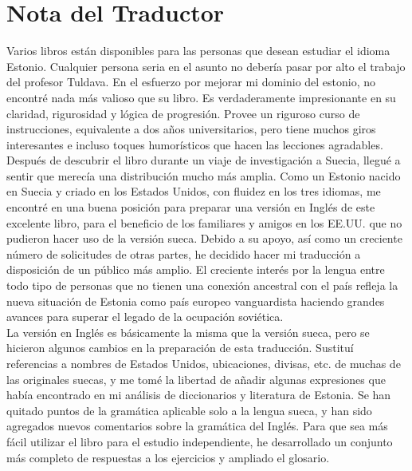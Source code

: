 

\chapter*{Nota del Traductor} %

Varios libros están disponibles para las personas que desean estudiar el idioma Estonio. Cualquier persona seria en el asunto no debería pasar por alto el trabajo del profesor Tuldava. En el esfuerzo por mejorar mi dominio del estonio, no encontré nada más valioso que su libro. Es verdaderamente impresionante en su claridad, rigurosidad y lógica de progresión. Provee un riguroso curso de instrucciones, equivalente a dos años universitarios, pero tiene muchos giros interesantes e incluso toques humorísticos que hacen las lecciones agradables.\\

Después de descubrir el libro durante un viaje de investigación a Suecia, llegué a sentir que merecía una distribución mucho más amplia. Como un Estonio nacido en Suecia y criado en los Estados Unidos, con fluidez en los tres idiomas, me encontré en una buena posición para preparar una versión en Inglés de este excelente libro, para el beneficio de los familiares y amigos en los EE.UU. que no pudieron hacer uso de la versión sueca. Debido a su apoyo, así como un creciente número de solicitudes de otras partes, he decidido hacer mi traducción a disposición de un público más amplio. El creciente interés por la lengua entre todo tipo de personas que no tienen una conexión ancestral con el país refleja la nueva situación de Estonia como país europeo vanguardista haciendo grandes avances para superar el legado de la ocupación soviética.\\

La versión en Inglés es básicamente la misma que la versión sueca, pero se hicieron algunos cambios en la preparación de esta traducción. Sustituí referencias a nombres de Estados Unidos, ubicaciones, divisas, etc. de muchas de las originales suecas, y me tomé la libertad de añadir algunas expresiones que había encontrado en mi análisis de diccionarios y literatura de Estonia. Se han quitado puntos de la gramática aplicable solo a la lengua sueca, y han sido agregados nuevos comentarios sobre la gramática del Inglés. Para que sea más fácil utilizar el libro para el estudio independiente, he desarrollado un conjunto más completo de respuestas a los ejercicios y ampliado el glosario.\\

